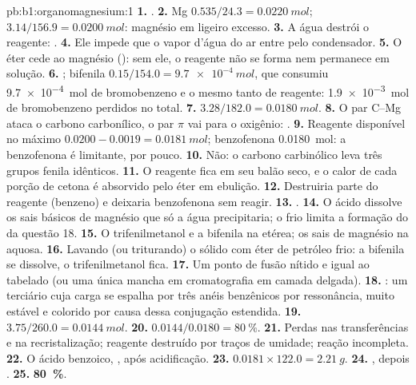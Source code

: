 \begin{solution}{pb:b1:organomagnesium:1}
\textbf{1.} .
\textbf{2.} Mg $0.535/24.3 = \qty{0.0220}{mol}$;  $3.14/156.9 =
\qty{0.0200}{mol}$: magnésio em ligeiro excesso.
\textbf{3.} A água destrói o reagente: .
\textbf{4.} Ele impede que o vapor d'água do ar entre pelo condensador.
\textbf{5.} O éter cede  ao magnésio ():
sem ele, o reagente não se forma nem permanece em solução.
\textbf{6.} ; bifenila
$0.15/154.0 = \qty{9.7e-4}{mol}$, que consumiu \qty{9.7e-4}{mol} de
bromobenzeno e o mesmo tanto de reagente: \qty{1.9e-3}{mol} de
bromobenzeno perdidos no total.
\textbf{7.} $3.28/182.0 = \qty{0.0180}{mol}$.
\textbf{8.} O par C--Mg ataca o carbono carbonílico, o par $\pi$ vai para
o oxigênio:  .
\textbf{9.} Reagente disponível no máximo $0.0200 - 0.0019 = \qty{0.0181}{mol}$;
benzofenona \qty{0.0180}{mol}: a benzofenona é limitante, por pouco.
\textbf{10.} Não: o carbono carbinólico leva três grupos fenila idênticos.
\textbf{11.} O reagente fica em seu balão seco, e o calor de cada porção
de cetona é absorvido pelo éter em ebulição.
\textbf{12.} Destruiria parte do reagente (benzeno) e deixaria
benzofenona sem reagir.
\textbf{13.} .
\textbf{14.} O ácido dissolve os sais básicos de magnésio que só a água
precipitaria; o frio limita a formação do  da questão 18.
\textbf{15.} O trifenilmetanol e a bifenila na  etérea; os sais de
magnésio na  aquosa.
\textbf{16.} Lavando (ou triturando) o sólido com éter de petróleo frio:
a bifenila se dissolve, o trifenilmetanol fica.
\textbf{17.} Um ponto de fusão nítido e igual ao tabelado (ou uma
única mancha em cromatografia em camada delgada).
\textbf{18.} : um 
terciário cuja carga se espalha por três anéis benzênicos por
ressonância, muito estável e colorido por causa dessa conjugação
estendida.
\textbf{19.} $3.75/260.0 = \qty{0.0144}{mol}$.
\textbf{20.} $0.0144/0.0180 = \qty{80}{\percent}$.
\textbf{21.} Perdas nas transferências e na recristalização; reagente
destruído por traços de umidade; reação incompleta.
\textbf{22.} O ácido benzoico, , após acidificação.
\textbf{23.} $0.0181 \times 122.0 = \qty{2.21}{g}$.
\textbf{24.} , depois
.
\textbf{25.} \textbf{\qty{80}{\percent}}.
\end{solution}

